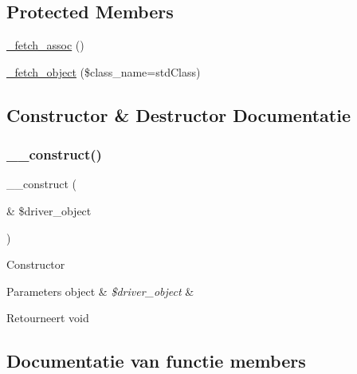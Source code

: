 \subsection*{Protected Members}
\begin{DoxyCompactItemize}
\item 
\mbox{\hyperlink{class_c_i___d_b__result_a43a9a92817f1334a1c10752ec44275a0}{\+\_\+fetch\+\_\+assoc}} ()
\item 
\mbox{\hyperlink{class_c_i___d_b__result_a60806be6a9c2488820813c2a7f4fef71}{\+\_\+fetch\+\_\+object}} (\$class\+\_\+name=\textquotesingle{}std\+Class\textquotesingle{})
\end{DoxyCompactItemize}


\subsection{Constructor \& Destructor Documentatie}
\mbox{\label{class_c_i___d_b__result_a8e093c8b6e5733bc3f306385ee426ab7}} 
\subsubsection{\texorpdfstring{\_\_construct()}{\_\_construct()}}
{\footnotesize\ttfamily \+\_\+\+\_\+construct (\begin{DoxyParamCaption}\item[{\&}]{\$driver\+\_\+object }\end{DoxyParamCaption})}

Constructor


\begin{DoxyParams}[1]{Parameters}
object & {\em \$driver\+\_\+object} & \\
\hline
\end{DoxyParams}
\begin{DoxyReturn}{Retourneert}
void 
\end{DoxyReturn}


\subsection{Documentatie van functie members}
\mbox{\label{class_c_i___d_b__result_a43a9a92817f1334a1c10752ec44275a0}} 
